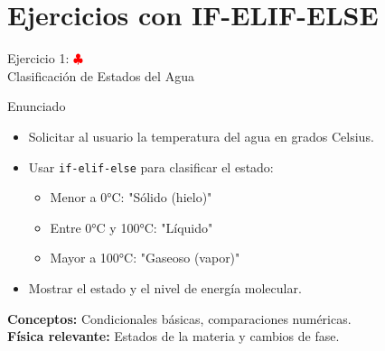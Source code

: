 \documentclass[10pt]{beamer}
\begin{document}
\section{Ejercicios con IF-ELIF-ELSE}

\begin{frame}{Ejercicio 1: \hfill \textcolor{red}{$\clubsuit$} \\ Clasificación de Estados del Agua}
  \begin{block}{Enunciado}
    \begin{itemize}
      \item Solicitar al usuario la temperatura del agua en grados Celsius.
      \item Usar \texttt{if-elif-else} para clasificar el estado:
        \begin{itemize}
          \item Menor a 0°C: "Sólido (hielo)"
          \item Entre 0°C y 100°C: "Líquido"
          \item Mayor a 100°C: "Gaseoso (vapor)"
        \end{itemize}
      \item Mostrar el estado y el nivel de energía molecular.
    \end{itemize}
  \end{block}
  
  \textbf{Conceptos:} Condicionales básicas, comparaciones numéricas.
  \\
  \textbf{Física relevante:} Estados de la materia y cambios de fase.
\end{frame}
\end{document}

